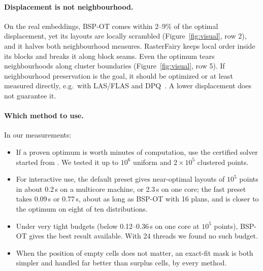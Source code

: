 \paragraph{Displacement is not neighbourhood.} On the real embeddings, BSP-OT comes within
2--9\% of the optimal displacement, yet its layouts are locally scrambled
(Figure~\ref{fig:visual}, row 2), and it halves both neighbourhood measures. RasterFairy
keeps local order inside its blocks and breaks it along block seams. Even the optimum
tears neighbourhoods along cluster boundaries (Figure~\ref{fig:visual}, row 5). If
neighbourhood preservation is the goal, it should be optimized or at least measured
directly, e.g.\ with LAS/FLAS and DPQ~\citep{barthel2023improved}. A lower displacement
does not guarantee it.

\paragraph{Which method to use.} In our measurements:
\begin{itemize}
\item If a proven optimum is worth minutes of computation, use the certified solver
  started from \ShuffleSnap. We tested it up to $10^6$ uniform and $2\times10^5$ clustered
  points.
\item For interactive use, the default preset gives near-optimal layouts of $10^5$ points
  in about 0.2\,s on a multicore machine, or 2.3\,s on one core; the fast preset takes
  0.09\,s or 0.77\,s, about as long as BSP-OT with 16 plans, and is closer to the optimum on
  eight of ten distributions.
\item Under very tight budgets (below 0.12--0.36\,s on one core at $10^5$ points), BSP-OT
  gives the best result available. With 24 threads we found no such budget.
\item When the position of empty cells does not matter, an exact-fit mask is both simpler
  and handled far better than surplus cells, by every method.
\end{itemize}

